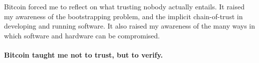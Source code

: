 Bitcoin forced me to reflect on what trusting nobody actually entails.
It raised my awareness of the bootstrapping problem, and the implicit
chain-of-trust in developing and running software. It also raised my
awareness of the many ways in which software and hardware can be
compromised.

\paragraph{Bitcoin taught me not to trust, but to verify.}

%
%
%
%
